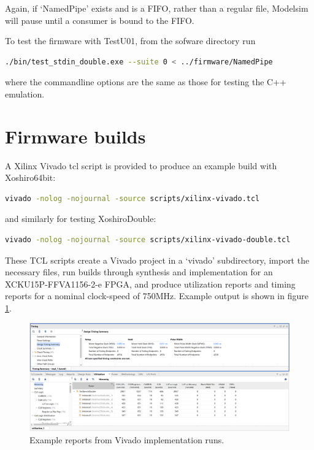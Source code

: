 \documentclass{article}
\begin{document}
Again, if `NamedPipe' exists and is a FIFO, rather than a regular file, Modelsim will pause until a consumer is bound to the FIFO.

To test the firmware with TestU01, from the sofware directory run 

\begin{minipage}{1.0\textwidth}
\centering
\begin{lstlisting}[language=bash, label=lst:TestU01PipeDouble]
./bin/test_stdin_double.exe --suite 0 < ../firmware/NamedPipe
\end{lstlisting}
\end{minipage}

where the commandline options are the same as those for testing the C++ emulation.

\section{Firmware builds}

A Xilinx Vivado tcl script is provided to produce an example build with Xoshiro64bit:

\begin{minipage}{1.0\textwidth}
\centering
\begin{lstlisting}[language=bash, label=lst:Vivado]
vivado -nolog -nojournal -source scripts/xilinx-vivado.tcl
\end{lstlisting}
\end{minipage} 

and similarly for testing XoshiroDouble:

\begin{minipage}{1.0\textwidth}
\centering
\begin{lstlisting}[language=bash, label=lst:VivadoDouble]
vivado -nolog -nojournal -source scripts/xilinx-vivado-double.tcl
\end{lstlisting}
\end{minipage} 

These TCL scripts create a Vivado project in a `vivado' subdirectory, import the necessary files, run builds through synthesis and implementation for an XCKU15P-FFVA1156-2-e FPGA, and produce utilization reports and timing reports for a nominal clock-speed of 750MHz. Example output is shown in figure \ref{fig:VivadoOutput}.

\begin{figure}[ht]
\centering
\includegraphics[width=\textwidth]{VivadoOutput.png}
\caption{Example reports from Vivado implementation runs.}
\label{fig:VivadoOutput}
\end{figure}
\end{document}
